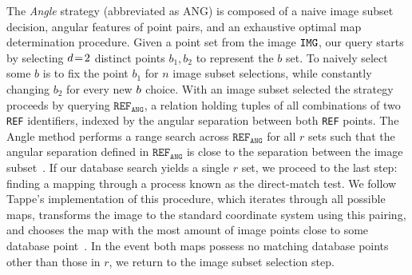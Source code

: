 The \textit{Angle} strategy (abbreviated as ANG) is composed of a naive image subset decision, angular features of point pairs, and an exhaustive optimal map determination procedure.
Given a point set from the image $\texttt{IMG}$, our query starts by selecting $d\!=\! 2$ distinct points $b_1, b_2$ to represent the $b$ set.
To naively select some $b$ is to fix the point $b_1$ for $n$ image subset selections, while constantly changing $b_2$ for every new $b$ choice.
With an image subset selected the strategy proceeds by querying $\texttt{REF}_\texttt{ANG}$, a relation holding tuples of all combinations of two \texttt{REF} identifiers, indexed by the angular separation between both \texttt{REF} points.
The Angle method performs a range search across $\texttt{REF}_\texttt{ANG}$ for all $r$ sets such that the angular separation defined in $\texttt{REF}_\texttt{ANG}$ is close to the separation between the image subset~\cite{bratt:analysisStarIdentification}.
If our database search yields a single $r$ set, we proceed to the last step: finding a mapping through a process known as the direct-match test.
We follow Tappe's implementation of this procedure, which iterates through all possible maps, transforms the image to the standard coordinate system using this pairing, and chooses the map with the most amount of image points close to some database point~\cite{tappe:starTrackerDevelopment,needelman:stellarAttitudeAcquisition}.
In the event both maps possess no matching database points other than those in $r$, we return to the image subset selection step.



